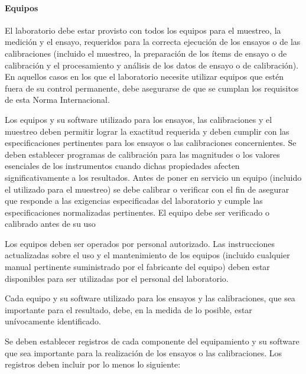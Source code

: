 \paragraph{Equipos}
\par 
El laboratorio debe estar provisto con todos los equipos para el muestreo, la medición y el ensayo,
requeridos para la correcta ejecución de los ensayos o de las calibraciones (incluido el muestreo, la
preparación de los ítems de ensayo o de calibración y el procesamiento y análisis de los datos de ensayo o
de calibración). En aquellos casos en los que el laboratorio necesite utilizar equipos que estén fuera de su
control permanente, debe asegurarse de que se cumplan los requisitos de esta Norma Internacional.

\par \noindent
Los equipos y su software utilizado para los ensayos, las calibraciones y el muestreo deben permitir
lograr la exactitud requerida y deben cumplir con las especificaciones pertinentes para los ensayos o las
calibraciones concernientes. Se deben establecer programas de calibración para las magnitudes o los valores
esenciales de los instrumentos cuando dichas propiedades afecten significativamente a los resultados. Antes
de poner en servicio un equipo (incluido el utilizado para el muestreo) se debe calibrar o verificar con el fin de
asegurar que responde a las exigencias especificadas del laboratorio y cumple las especificaciones
normalizadas pertinentes. El equipo debe ser verificado o calibrado antes de su uso 

\par \noindent
Los equipos deben ser operados por personal autorizado. Las instrucciones actualizadas sobre el
uso y el mantenimiento de los equipos (incluido cualquier manual pertinente suministrado por el fabricante del
equipo) deben estar disponibles para ser utilizadas por el personal del laboratorio.

\par \noindent
Cada equipo y su software utilizado para los ensayos y las calibraciones, que sea importante para el
resultado, debe, en la medida de lo posible, estar unívocamente identificado.

\par \noindent
Se deben establecer registros de cada componente del equipamiento y su software que sea
importante para la realización de los ensayos o las calibraciones. Los registros deben incluir por lo menos lo
siguiente:

